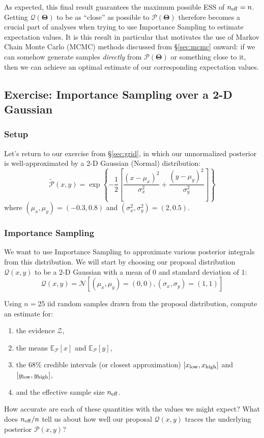 \documentclass[12pt, titlepage]{article}
\newcommand{\Normal}[2]{\ensuremath{\mathcal{N}\left[{#1}, {#2} \right]}} %
\newcommand{\meanwrt}[2]{\ensuremath{\mathbb{E}_{{#2}}\left[{#1}\right]}}
\newcommand{\params}{\ensuremath{\boldsymbol\Theta}}
\newcommand{\posterior}{\ensuremath{\mathcal{P}}}
\newcommand{\proposal}{\ensuremath{\mathcal{Q}}}
\newcommand{\evidence}{\ensuremath{\mathcal{Z}}}
\begin{document}
As expected, this final result guarantees the maximum
possible ESS of $n_{\rm eff} = n$. Getting
$\proposal(\params)$ to be as ``close'' as possible
to $\posterior(\params)$ therefore becomes a crucial part of
analyses when trying to use Importance Sampling 
to estimate expectation values. It is this result in particular 
that motivates the use of Markov Chain Monte Carlo (MCMC) methods
discussed from \S\ref{sec:mcmc} onward:
if we can somehow generate samples \textit{directly}
from $\posterior(\params)$ or something close to it, 
then we can achieve an optimal estimate of our
corresponding expectation values.

\subsection*{Exercise: Importance Sampling over a 2-D Gaussian} 
\label{exercise:importance}

\subsubsection*{Setup}

Let's return to our exercise from \S\ref{sec:grid}, in which
our unnormalized posterior is well-approximated by a 2-D Gaussian (Normal)
distribution:
\begin{equation*}
    \tilde{\posterior}(x,y) 
    = \exp\left\{-\frac{1}{2}\left[\frac{(x-\mu_x)^2}{\sigma_x^2}
    + \frac{(y-\mu_y)^2}{\sigma_y^2}\right]\right\}
\end{equation*}
where $(\mu_x,\mu_y)=(-0.3,0.8)$ and $(\sigma_x^2,\sigma_y^2)=(2,0.5)$.

\subsubsection*{Importance Sampling}

We want to use Importance Sampling to approximate various posterior
integrals from this distribution.
We will start by choosing our proposal distribution $\proposal(x,y)$
to be a 2-D Gaussian with a mean of $0$ and standard deviation of $1$:
\begin{equation*}
    \proposal(x,y) = \Normal{(\mu_x,\mu_y)=(0,0)}{(\sigma_x,\sigma_y)=(1,1)}
\end{equation*}

Using $n=25$ iid random samples drawn 
from the proposal distribution, compute an estimate for:
\begin{enumerate}
    \item the evidence $\evidence$,
    \item the means $\meanwrt{x}{\posterior}$
    and $\meanwrt{y}{\posterior}$,
    \item the 68\% credible intervals (or closest approximation) 
    $[x_{\rm low}, x_{\rm high}]$ and $[y_{\rm low}, y_{\rm high}]$,
    \item and the effective sample size $n_{\rm eff}$.
\end{enumerate}
How accurate are each of these quantities with the values we might
expect? What does $n_{\rm eff}/n$ tell us about how well
our proposal $\proposal(x,y)$ traces the underlying posterior
$\posterior(x,y)$?
\end{document}
